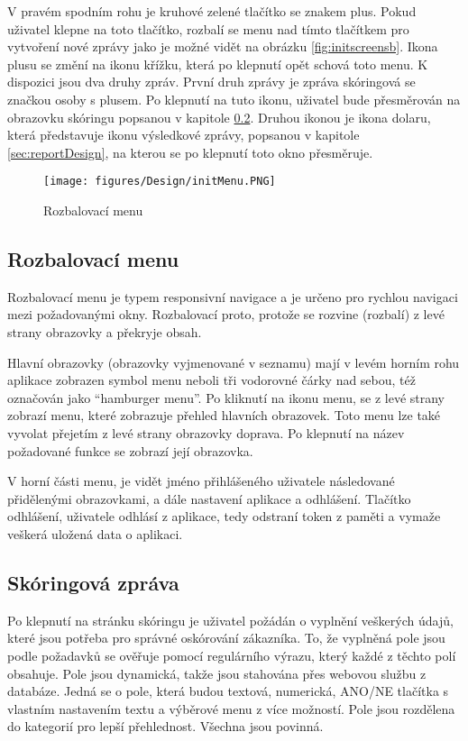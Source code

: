 \documentclass[11pt,twoside,a4paper]{book}
\begin{document}
V pravém spodním rohu je kruhové zelené tlačítko se znakem plus. Pokud uživatel klepne na toto tlačítko, rozbalí se menu nad tímto tlačítkem pro vytvoření nové zprávy jako je možné vidět na obrázku \ref{fig:initscreensb}. Ikona plusu se změní na ikonu křížku, která po klepnutí opět schová toto menu. K dispozici jsou dva druhy zpráv. První druh zprávy je zpráva skóringová se značkou osoby s plusem. Po klepnutí na tuto ikonu, uživatel bude přesměrován na obrazovku skóringu popsanou v kapitole \ref{sec:scoringDesign}. Druhou ikonou je ikona dolaru, která představuje ikonu výsledkové zprávy, popsanou v kapitole \ref{sec:reportDesign}, na kterou se po klepnutí toto okno přesměruje.

\begin{wrapfigure}[11]{R}{0.2\textwidth}
    \centering
	\setlength\intextsep{0pt}
	\texttt{[image: figures/Design/initMenu.PNG]}
	\caption{Rozbalovací menu}
    \label{fig:menuscreens}
\end{wrapfigure}

\subsection{Rozbalovací menu} \label{sec:menuDesign}
Rozbalovací menu je typem responsivní navigace a je určeno pro rychlou navigaci mezi požadovanými okny. Rozbalovací proto, protože se rozvine (rozbalí) z levé strany obrazovky a překryje obsah. 

Hlavní obrazovky (obrazovky vyjmenované v seznamu) mají v levém horním rohu aplikace zobrazen symbol menu neboli tři vodorovné čárky nad sebou, též označován jako “hamburger menu”. Po kliknutí na ikonu menu, se z levé strany zobrazí menu, které zobrazuje přehled hlavních obrazovek. Toto menu lze také vyvolat přejetím z levé strany obrazovky doprava. Po klepnutí na název požadované funkce se zobrazí její obrazovka. 

V horní části menu, je vidět jméno přihlášeného uživatele následované přidělenými obrazovkami, a dále nastavení aplikace a odhlášení. Tlačítko odhlášení, uživatele odhlásí z aplikace, tedy odstraní token z paměti a vymaže veškerá uložená data o aplikaci.

\subsection{Skóringová zpráva} \label{sec:scoringDesign}
Po klepnutí na stránku skóringu je uživatel požádán o vyplnění veškerých údajů, které jsou potřeba pro správné oskórování zákazníka. To, že vyplněná pole jsou podle požadavků se ověřuje pomocí regulárního výrazu, který každé z těchto polí obsahuje. Pole jsou dynamická, takže jsou stahována přes webovou službu z databáze. Jedná se o pole, která budou textová, numerická, ANO/NE tlačítka s vlastním nastavením textu a výběrové menu z více možností. Pole jsou rozdělena do kategorií pro lepší přehlednost. Všechna jsou povinná. 
\end{document}
